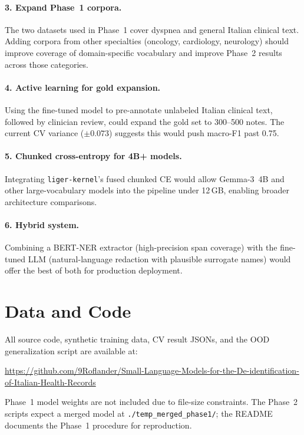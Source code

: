 \documentclass[11pt,a4paper]{article}
\begin{document}
\paragraph{3. Expand Phase~1 corpora.} The two datasets used in Phase~1 cover dyspnea and general Italian clinical text. Adding corpora from other specialties (oncology, cardiology, neurology) should improve coverage of domain-specific vocabulary and improve Phase~2 results across those categories.

\paragraph{4. Active learning for gold expansion.} Using the fine-tuned model to pre-annotate unlabeled Italian clinical text, followed by clinician review, could expand the gold set to 300--500 notes. The current CV variance ($\pm 0.073$) suggests this would push macro-F1 past 0.75.

\paragraph{5. Chunked cross-entropy for 4B+ models.} Integrating \texttt{liger-kernel}'s fused chunked CE would allow Gemma-3~4B and other large-vocabulary models into the pipeline under 12\,GB, enabling broader architecture comparisons.

\paragraph{6. Hybrid system.} Combining a BERT-NER extractor (high-precision span coverage) with the fine-tuned LLM (natural-language redaction with plausible surrogate names) would offer the best of both for production deployment.

\section*{Data and Code}

All source code, synthetic training data, CV result JSONs, and the OOD generalization script are available at:
\begin{center}
\url{https://github.com/9Roflander/Small-Language-Models-for-the-De-identification-of-Italian-Health-Records}
\end{center}

Phase~1 model weights are not included due to file-size constraints. The Phase~2 scripts expect a merged model at \texttt{./temp\_merged\_phase1/}; the README documents the Phase~1 procedure for reproduction.
\end{document}
